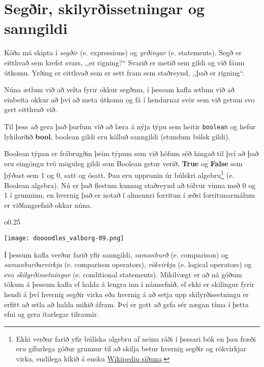 
\chapter{Segðir, skilyrðissetningar og sanngildi}\label{k:segðir}
Kóða má skipta í \emph{segðir} (e. expressions) og \emph{yrðingar} (e. statements).
Segð er eitthvað sem krefst svars, ,,er rigning?“
Svarið er metið sem gildi og við fáum útkomu.
Yrðing er eitthvað sem er sett fram sem staðreynd, ,,það er rigning“.

Núna ætlum við að velta fyrir okkur segðum, í þessum kafla ætlum við að einbeita okkur að því að meta útkomu og fá í hendurnar svör sem við getum svo gert eitthvað við.

Til þess að gera það þurfum við að læra á nýja týpu sem heitir \texttt{boolean} og hefur lykilorðið \textbf{bool}, boolean gildi eru kölluð sanngildi (stundum búlsk gildi).

Boolean týpan er frábrugðin þeim týpum sem við höfum séð hingað til því að það eru eingöngu tvö möguleg gildi sem Boolean getur verið, \textbf{True} og \textbf{False} sem þýðast sem 1 og 0, satt og ósatt.
Þau eru upprunin úr búlskri algebru\footnote{Ekki verður farið yfir búlíska algebru af neinu ráði í þessari bók en þau fræði eru gífurlega góður grunnur til að skilja betur hvernig segðir og rökvirkjar virka, endilega kíkið á ensku \href{https://en.wikipedia.org/wiki/Boolean_algebra}{Wikipediu síðuna}.} (e. Boolean algebra).
Nú er það flestum kunnug staðreynd að tölvur vinna með 0 og 1 í grunninn, en hvernig það er notað í almennri forritun í æðri forritunarmálum er viðfangsefnið okkar núna.

\begin{wrapfigure}{o}{0.25\textwidth} %
	\begin{center}
		\texttt{[image: doooodles\_valborg-09.png]}
	\end{center}
\end{wrapfigure}

Í þessum kafla verður farið yfir sanngildi,  \emph{samanburð} (e. comparison) og \emph{samanburðarvirkja} (e. comparison operators), \emph{rökvirkja} (e. logical operators) og svo \emph{skilyrðissetningar} (e. conditional statements).
Mikilvægt er að ná góðum tökum á þessum kafla ef halda á lengra inn í námsefnið, ef ekki er skilingur fyrir hendi á því hvernig segðir virka eða hvernig á að setja upp skilyrðissetningu er erfitt að ætla að halda mikið áfram.
Því er gott að gefa sér nægan tíma í þetta efni og gera ítarlegar tilraunir.

